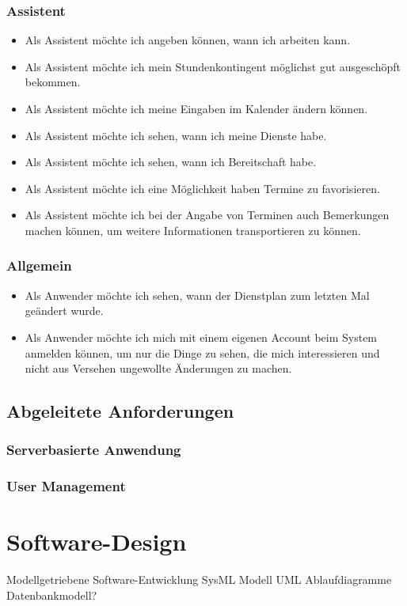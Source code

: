\documentclass[12pt,a4paper,titlepage]{article} %
\begin{document}
\subsubsection{Assistent}
\begin{itemize}
\item Als Assistent möchte ich angeben können, wann ich arbeiten kann.
\item Als Assistent möchte ich mein Stundenkontingent möglichst gut ausgeschöpft bekommen.
\item Als Assistent möchte ich meine Eingaben im Kalender ändern können.
\item Als Assistent möchte ich sehen, wann ich meine Dienste habe.
\item Als Assistent möchte ich sehen, wann ich Bereitschaft habe.
\item Als Assistent möchte ich eine Möglichkeit haben Termine zu favorisieren.
\item Als Assistent möchte ich bei der Angabe von Terminen auch Bemerkungen machen können, um weitere Informationen transportieren zu können.
\end{itemize}

\subsubsection{Allgemein}
\begin{itemize}
\item Als Anwender möchte ich sehen, wann der Dienstplan zum letzten Mal geändert wurde.
\item Als Anwender möchte ich mich mit einem eigenen Account beim System anmelden können, um nur die Dinge zu sehen, die mich interessieren und nicht aus Versehen ungewollte Änderungen zu machen.
\end{itemize}


\subsection{Abgeleitete Anforderungen}
\subsubsection{Serverbasierte Anwendung}
\subsubsection{User Management}


\section{Software-Design} %
Modellgetriebene Software-Entwicklung
SysML Modell
UML Ablaufdiagramme
Datenbankmodell?
\end{document}
